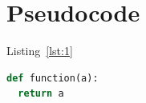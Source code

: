 \documentclass[english]{article}
\begin{document}
\clearpage
\pagebreak
\section{Pseudocode}

Listing~\ref{lst:1}

\begin{lstlisting}[language=Python, caption=Caption, label=lst:1]
def function(a):
  return a
\end{lstlisting}


\clearpage
\pagebreak
\printbibliography
\end{document}
